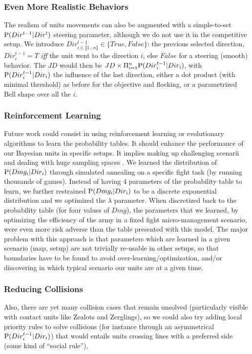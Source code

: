 \subsubsection{Even More Realistic Behaviors}
The realism of units movements can also be augmented with a simple-to-set $\mathrm{P}(Dir^{t-1}|Dir^t)$ steering parameter, although we do not use it in the competitive setup. We introduce $Dir_{i \in \llbracket 1 \dots n\rrbracket }^{t-1} \in \{True, False\}$: the previous selected direction, $Dir_i^{t-1} = T$ \textit{iff} the unit went to the direction $i$, else $False$ for a steering (smooth) behavior. The $JD$ would then be $JD \times \Pi_{i=1}^{n} \mathrm{P}(Dir_i^{t-1} | Dir_i)$, with $\mathrm{P}(Dir_i^{t-1} | Dir_i)$ the influence of the last direction, either a dot product (with minimal threshold) as before for the objective and flocking, or a parametrized Bell shape over all the $i$.

\subsubsection{Reinforcement Learning}
Future work could consist in using reinforcement learning \citep{Sutton} or evolutionary algorithms \citep{SmithCIG10} to learn the probability tables. It should enhance the performance of our Bayesian units in specific setups. It implies making up challenging scenarii and dealing with huge sampling spaces \citep{Asmuth09}. We learned the distribution of $\mathrm{P}(Dmg_i | Dir_i)$ through simulated annealing on a specific fight task (by running thousands of games). Instead of having 4 parameters of the probability table to learn, we further restrained $\mathrm{P}(Dmg_i|Dir_i)$ to be a discrete exponential distribution and we optimized the $\lambda$ parameter. When discretized back to the probability table (for four values of $Dmg$), the parameters that we learned, by optimizing the efficiency of the army in a fixed fight micro-management scenario, were even more risk adverse than the table presented with this model. The major problem with this approach is that parameters which are learned in a given scenario (map, setup) are not trivially re-usable in other setups, so that boundaries have to be found to avoid over-learning/optimization, and/or discovering in which typical scenario our units are at a given time.

\subsubsection{Reducing Collisions}
Also, there are yet many collision cases that remain unsolved (particularly visible with contact units like Zealots and Zerglings), so we could also try adding local priority rules to solve collisions (for instance through an asymmetrical $\mathrm{P}(Dir_i^{t-1}|Dir_i)$) that would entails units crossing lines with a preferred side (some kind of ``social rule''),

